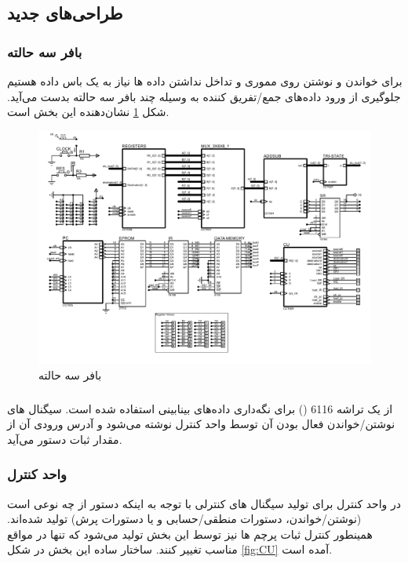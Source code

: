 \documentclass{article}
\begin{document}
\subsection{طراحی‌های جدید}
\subsubsection{بافر سه حالته}
برای خواندن و نوشتن روی مموری و تداخل نداشتن داده ها نیاز به یک باس داده هستیم جلوگیری از ورود داده‌های جمع/تفریق کننده به وسیله چند بافر سه حالته بدست می‌آید. شکل \ref{fig:tri} نشان‌دهنده این بخش است.

\begin{figure}
	\centering
	\includegraphics[scale=0.5,page=6]{./graphics/graphics}
	\caption{بافر سه حالته}
	\label{fig:tri}
\end{figure}

\subsubsection{}
از یک تراشه 6116 () برای نگه‌داری داده‌های بینابینی استفاده شده است. سیگنال های نوشتن/خواندن فعال بودن آن توسط واحد کنترل نوشته می‌شود و آدرس ورودی آن از مقدار ثبات دستور می‌آید.


\subsubsection{واحد کنترل}
در واحد کنترل برای تولید سیگنال های کنترلی با توجه به اینکه دستور از چه نوعی است (نوشتن/خواندن، دستورات منطقی/حسابی و یا دستورات پرش)‌ تولید شده‌اند. همینطور کنترل ثبات پرچم ها نیز توسط این بخش تولید می‌شود که تنها در مواقع مناسب تغییر کنند. ساختار ساده این بخش در شکل \ref{fig:CU} آمده است.
\end{document}
